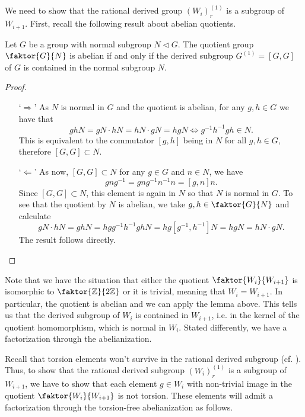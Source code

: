 We need to show that the rational derived group \((W_i)_r^{(1)}\) is a subgroup of \(W_{i+1}\).
First, recall the following result about abelian quotients.

\begin{lemma}
    Let \(G\) be a group with normal subgroup \(N \triangleleft G\).
    The quotient group \(\faktor{G}{N}\) is abelian if and only if the derived subgroup \(G^{(1)} = [G, G]\) of \(G\) is contained in the normal subgroup \(N\).
\end{lemma}
\begin{proof}
    \begin{itemize}
        \item[`\(\Rightarrow\)'] As \(N\) is normal in \(G\) and the quotient is abelian, for any \(g,h \in G\) we have that
            \[ghN = gN \cdot hN = hN \cdot gN = hgN \iff g^{-1}h^{-1}gh \in N.\]
            This is equivalent to the commutator \([g, h]\) being in \(N\) for all \(g,h \in G\), therefore \([G, G] \subset N\).
        
        \item[`\(\Leftarrow\)'] As now, \([G, G] \subset N\) for any \(g \in G\) and \(n \in N\), we have
            \[gng^{-1} = gng^{-1}n^{-1}n = [g, n]n.\]
            Since \([G, G] \subset N\), this element is again in \(N\) so that \(N\) is normal in \(G\).
            To see that the quotient by \(N\) is abelian, we take \(g, h \in \faktor{G}{N}\) and calculate
            \[gN \cdot hN = ghN = hgg^{-1}h^{-1}ghN = hg[g^{-1}, h^{-1}]N = hgN = hN \cdot gN.\]
            The result follows directly.
    \end{itemize}\vspace*{-2\parskip}
\end{proof}

\noindent
Note that we have the situation that either the quotient \(\faktor{W_i}{W_{i+1}}\) is isomorphic to \(\faktor{\Z}{2\Z}\) or it is trivial, meaning that \(W_{i} = W_{i+1}\).
In particular, the quotient is abelian and we can apply the lemma above.
This tells us that the derived subgroup of \(W_i\) is contained in \(W_{i+1}\), i.e. in the kernel of the quotient homomorphism, which is normal in \(W_i\).
Stated differently, we have a factorization through the abelianization.

\noindent
Recall that torsion elements won't survive in the rational derived subgroup (cf. ).
Thus, to show that the rational derived subgroup \((W_i)_r^{(1)}\) is a subgroup of \(W_{i+1}\), we have to show that each element \(g \in W_i\) with non-trivial image in the quotient \(\faktor{W_i}{W_{i+1}}\) is not torsion.
These elements will admit a factorization through the torsion-free abelianization as follows.
\begin{figure}[h!]
    \centering
\end{figure}

